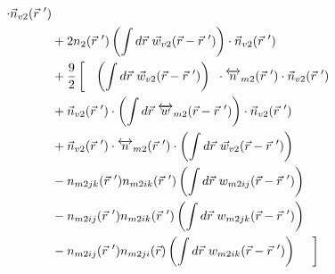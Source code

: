 \documentclass[double,12pt]{beavtex}
\begin{document}
\begin{align}
     \cdot \vec n_{v2}(\vec r~') \nonumber\\
      &+ 2n_2(\vec r~')\left(\int d\vec r ~\vec 
     w_{v2}(\vec r-\vec r~')\right)\cdot \vec n_{v2}(\vec r~')\nonumber \\
     &+\frac{9}{2}\left[\color{white}\frac{1}{1}\color{black}\left(\int 
     d\vec r ~\vec w_{v2}(\vec r-\vec r~')\right)\color{white}\right]
     \color{black}
     \cdot \overleftrightarrow n_{m2}(\vec r~')\cdot \vec n_{v2}(\vec r~') 
     \nonumber\\
     &+\vec n_{v2}(\vec r~')\cdot \left(\int d\vec r ~\overleftrightarrow 
     w_{m2}(\vec r-\vec r~')\right)
     \cdot \vec n_{v2}( \vec r~') \nonumber\\
%     
     &+ \color{white}\color{black}\vec n_{v2}( \vec r~')\cdot 
     \overleftrightarrow n_{m2}(\vec r~')
     \cdot \left(\int d\vec r ~\vec w_{v2}(\vec r-\vec r~')\right)
     \nonumber\\
     &-n_{m2jk}(\vec r~')n_{m2ik}(\vec r~')\left(\int d\vec r~w_{m2ij}
     (\vec r-\vec r~')\right) \nonumber \\
     &-n_{m2ij}(\vec r~')n_{m2ik}(\vec r~')\left(\int d\vec r~w_{m2jk}
     (\vec r-\vec r~')\right)\nonumber \\
     &-n_{m2ij}(\vec r~')n_{m2ji}(\vec r)\left(\int d\vec r~w_{m2ik}
     (\vec r-\vec r~')\right)     
     \color{white}\left[\frac{1}{1}\color{black}\right] 
\end{align} 
\end{document}
